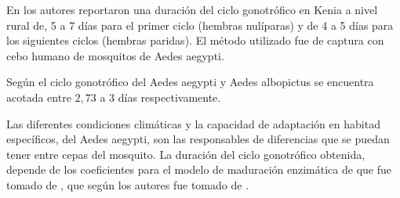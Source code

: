 En \cite{trpis1986dispersal} los autores reportaron una duración del ciclo gonotrófico en Kenia a
nivel rural de, 5 a 7 días para el primer ciclo (hembras nulíparas) y de 4 a 5 días para los
siguientes ciclos (hembras paridas). El método utilizado fue de captura con cebo humano de
mosquitos de Aedes aegypti.

Según \cite{sivanathan2006ecology} el ciclo gonotrófico del Aedes aegypti y Aedes albopictus se
encuentra acotada entre $2,73$ a 3 días respectivamente.

Las diferentes condiciones climáticas y la capacidad de adaptación en habitad específicos, del
Aedes aegypti, son las responsables de diferencias que se puedan tener entre cepas del mosquito.
La duración del ciclo gonotrófico obtenida, depende de los coeficientes para el modelo de
maduración enzimática de \cite{sharpe1977reaction} que fue tomado de \cite{otero2006stochastic},
que según los autores fue tomado de \cite{focks1993dynamic}.

